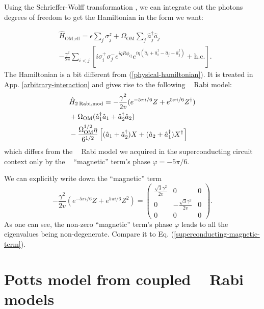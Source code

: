 \documentclass[reprint, aps, prx, amsmath, amssymb, longbibliography, superscriptaddress]{revtex4-2}
\DeclareMathOperator{\Zthree}{\mathbb{Z}_3}
\begin{document}
Using the Schrieffer-Wolff transformation \cite{bravyi_schrieffer_2011}, we can integrate out the photons degrees of freedom to get the Hamiltonian in the form we want:

\begin{equation}
\begin{aligned}
&\hat{H}_{\text{OM,eff}}=  \epsilon \sum_j \sigma_j^z + \Omega_{\text{OM}} \sum_j \hat{a}_j^{\dagger} \hat{a}_j \\
& -\frac{\gamma^2}{2v} \sum_{i<j}\left[i \sigma_i^{+} \sigma_j^- e^{i q R \phi_{i j}} e^{i \eta\left(\hat{a}_i+\hat{a}_i^{\dagger}-\hat{a}_j-\hat{a}_j^{\dagger}\right)}+\text {h.c.}\right].
\end{aligned}
\end{equation}
The Hamiltonian is a bit different from (\ref{physical-hamiltonian}). It is treated in App. \ref{arbitrary-interaction} and gives rise to the following $\Zthree$ Rabi model:
\begin{equation}
\begin{aligned}
    &\hat H_{\text{2\:Rabi,mod}}= - \frac{\gamma^2}{2v} (e^{-5\pi i/6} Z + e^{5\pi i/6} Z^{\dagger}) \\
    &+ \Omega_{\text{OM}} (\hat a_1^{\dagger} \hat a_1 + \hat a_2^{\dagger} \hat a_2) \\
    &- \frac{\Omega_{\text{OM}}^{1/2} \eta}{6^{1/2}}\left[(\hat a_1 + \hat a_2^{\dagger}) X  + (\hat a_2 + \hat a_1^{\dagger}) X^{\dagger}  \right]
\end{aligned}
\end{equation}
which differs from the $\Zthree $ Rabi model we acquired in the superconducting circuit context only by the $\Zthree$ ``magnetic'' term's phase $\varphi = - 5\pi/6$.

We can explicitly write down the ``magnetic'' term
\begin{equation}
    - \frac{\gamma^2}{2v} (e^{-5\pi i/6} Z + e^{5\pi i/6} Z^2) = \begin{pmatrix}
        \frac{\sqrt{3}\gamma^2}{2v} & 0 & 0 \\ 0 & -\frac{\sqrt{3}\gamma^2}{2v} & 0 \\ 0 & 0 & 0 
    \end{pmatrix}.
\end{equation}
As one can see, the non-zero ``magnetic'' term's phase $\varphi$ leads to all the eigenvalues being non-degenerate. Compare it to Eq. (\ref{superconducting-magnetic-term}).




\section{Potts model from coupled \texorpdfstring{$\Zthree$}{Z3} Rabi models}
\label{potts-model}
\end{document}
